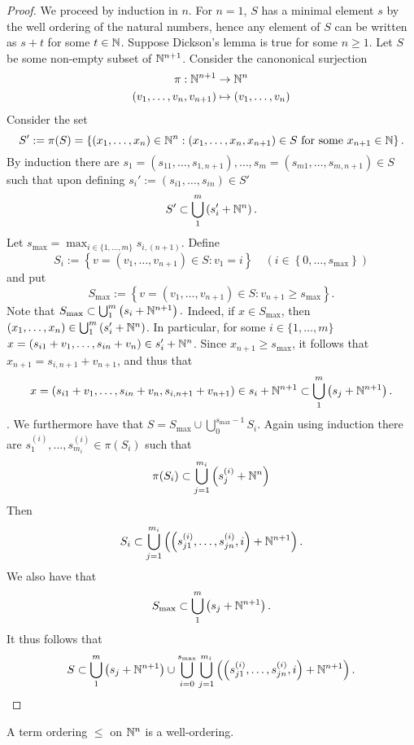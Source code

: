 \begin{proof}
    We proceed by induction in $n$. For $n=1$, $S$ has a minimal element $s$ by the well ordering of the natural numbers, hence any element of $S$ can be written as $s+t$ for some $t\in \mathbb{N}$. Suppose Dickson's lemma is true for some $n\geq 1$. Let $S$ be some non-empty subset of $\mathbb{N}^{n+1}$. Consider the canononical surjection 
    \begin{gather*}
        \pi : \mathbb{N}^{n+1}\rightarrow \mathbb{N}^n\\
        (v_1,\dots,v_n,v_{n+1})\mapsto (v_1,\dots,v_n)
    \end{gather*}
    Consider the set 
    $$S' := \pi(S) = \left\{(x_1,\dots,x_n)\in \mathbb{N}^n : (x_1,\dots,x_n,x_{n+1})\in S \text{ for some }x_{n+1}\in \mathbb{N} \right\}.$$
    By induction there are $s_1=(s_{11},\dots,s_{1,n+1}),\dots,s_m=
    (s_{m1},\dots,s_{m,n+1})\in S$ such that upon defining $s_i' := 
    (s_{i1},\dots,s_{in})\in S'$ 
    $$S' \subset \bigcup_1^m \left(s_i'+\mathbb{N}^n\right).$$
    Let $s_\text{max} = \max_{i\in \{1,\dots,m\}} s_{i,(n+1)}$.
    Define 
    $$S_i :=\left\{v=(v_1,\dots,v_{n+1})\in S : v_1 = i\right\} \quad \left(i\in\left\{0,\dots, s_\text{max}\right\}\right)$$
    and put 
    $$S_\text{max} := \left\{ v=(v_1,\dots,v_{n+1}) \in S : v_{n+1} \geq s_\text{max}\right\}.$$
    Note that $S_{\max} \subset \bigcup_1^m\left(s_i+\mathbb{N}^{n+1}\right).$ Indeed, if $x\in S_{\max}$, then $(x_1,\dots,x_n)\in \bigcup_1^m \left(s_i'+\mathbb{N}^n\right)$. In particular, for some $i\in\{1,\dots,m\}$  $x = (s_{i1}+v_1,\dots,s_{in}+v_n)\in s_i'+\mathbb{N}^n$. Since $x_{n+1}\geq s_{\max}$, it follows that $x_{n+1} = s_{i,n+1}+v_{n+1}$, and thus that 
    $$x = \left(s_{i1}+v_1,\dots,s_{in}+v_n,s_{i,n+1}+v_{n+1}\right)\in s_i+\mathbb{N}^{n+1}\subset \bigcup_1^m \left( s_j+\mathbb{N}^{n+1}\right).$$.
    We furthermore have that $S = S_\text{max} \cup \bigcup_0^{s_\text{max}-1} S_i$. Again using induction there are $s_1^{(i)},\dots,s_{m_i}^{(i)}\in \pi(S_i)$ such that 
    $$\pi(S_i)\subset  \bigcup_{j=1}^{m_i} \left(s_j^{(i)} + \mathbb{N}^n\right)$$
    Then 
    $$S_i \subset \bigcup_{j=1}^{m_i} \left( \left(s_{j1}^{(i)},\dots,s_{jn}^{(i)},i\right) + \mathbb{N}^{n+1}\right).$$
    We also have that 
    $$S_{\max} \subset \bigcup_1^m \left(s_j + \mathbb{N}^{n+1}\right).$$
    It thus follows that 
    $$S \subset \bigcup_1^m \left(s_j + \mathbb{N}^{n+1}\right) \cup \bigcup_{i=0}^{s_{\max}} \bigcup_{j=1}^{m_i}\left( \left(s_{j1}^{(i)},\dots,s_{jn}^{(i)},i\right) + \mathbb{N}^{n+1}\right).$$
\end{proof}
\begin{corollary}
    A term ordering $\leq$ on $\mathbb{N}^n$ is a well-ordering. 
\end{corollary}
